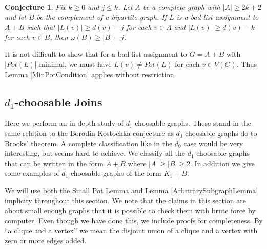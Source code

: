 \documentclass[12pt]{article}
\theoremstyle{plain}
\newtheorem*{conjecture}{Conjecture}
\theoremstyle{definition}
\theoremstyle{remark}
\begin{document}
\begin{conjecture}\label{CompleteBipartiteComplementJoin}
Fix $k \geq 0$ and $j \leq k$. Let $A$ be a complete graph with $|A| \geq 2k+2$ and let $B$ be the complement of a bipartite graph.  If $L$ is a bad list assignment to $A+B$ such that $|L(v)| \geq d(v) - j$ for each $v \in A$ and $|L(v)| \geq d(v) - k$ for each $v \in B$, then $\omega(B) \geq |B| - j$.
\end{conjecture}

It is not difficult to show that for a bad list assignment to $G = A + B$ with $|Pot(L)|$ minimal, we must have $L(v) \neq Pot(L)$ for each $v \in V(G)$.  Thus Lemma \ref{MinPotCondition} applies without restriction.

\subsection{$d_1$-choosable Joins}
Here we perform an in depth study of $d_1$-choosable graphs.  These stand in the same relation to the Borodin-Kostochka conjecture as $d_0$-choosable graphs do to Brooks' theorem.  A complete classification like in the $d_0$ case would be very interesting, but seems hard to achieve.  We classify all the $d_1$-choosable graphs that can be written in the form $A+B$ where $|A| \geq |B| \geq 2$.  In addition we give some examples of $d_1$-choosable graphs of the form $K_1 + B$.\newline

We will use both the Small Pot Lemma and Lemma \ref{ArbitrarySubgraphLemma} implicity throughout this section.  We note that the claims in this section are about small enough graphs that it is possible to check them with brute force by computer.  Even though we have done this, we include proofs for completeness.  By ``a clique and a vertex'' we mean the disjoint union of a clique and a vertex with zero or more edges added.
\end{document}
